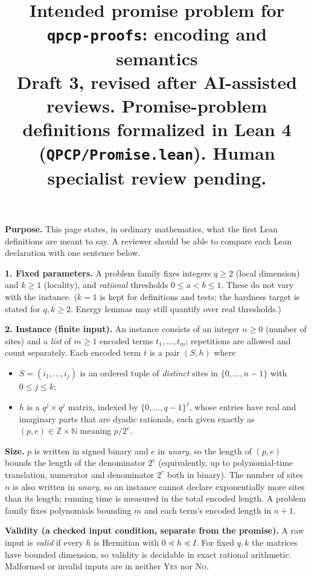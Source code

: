 \documentclass[10pt]{article}
\title{\vspace{-1.2cm}\large\bfseries Intended promise problem for \texttt{qpcp-proofs}: encoding and semantics\\[2pt]
\normalsize\mdseries Draft 3, revised after AI-assisted reviews. Promise-problem definitions formalized in Lean 4\\(\texttt{QPCP/Promise.lean}). Human specialist review pending.}
\date{\vspace{-1.4cm}}
\begin{document}
\maketitle

\textbf{Purpose.} This page states, in ordinary mathematics, what the first Lean definitions are meant to say.
A reviewer should be able to compare each Lean declaration with one sentence below.

\textbf{1. Fixed parameters.} A problem family fixes integers $q\ge 2$ (local dimension) and $k\ge 1$ (locality),
and \emph{rational} thresholds $0\le a<b\le 1$. These do not vary with the instance. ($k=1$ is kept for
definitions and tests; the hardness target is stated for $q,k\ge 2$. Energy lemmas may still quantify over real thresholds.)

\textbf{2. Instance (finite input).} An instance consists of an integer $n\ge 0$ (number of sites) and a
\emph{list} of $m\ge 1$ encoded terms $t_1,\dots,t_m$; repetitions are allowed and count separately.
Each encoded term $t$ is a pair $(S,h)$ where
\begin{itemize}\setlength{\itemsep}{0pt}
\item $S=(i_1,\dots,i_j)$ is an ordered tuple of \emph{distinct} sites in $\{0,\dots,n-1\}$ with $0\le j\le k$;
\item $h$ is a $q^{j}\times q^{j}$ matrix, indexed by $\{0,\dots,q-1\}^{j}$, whose entries have real and
imaginary parts that are dyadic rationals, each given exactly as $(p,e)\in\mathbb{Z}\times\mathbb{N}$ meaning $p/2^{e}$.
\end{itemize}
\textbf{Size.} $p$ is written in signed binary and $e$ in \emph{unary}, so the length of $(p,e)$ bounds the length of
the denominator $2^{e}$ (equivalently, up to polynomial-time translation, numerator and denominator $2^e$ both in binary). The number of sites $n$ is also written in \emph{unary}, so an instance cannot declare exponentially more sites than its length; running time is measured in the total encoded length. A problem family fixes polynomials bounding $m$ and each term's encoded length in $n+1$.

\textbf{Validity (a checked input condition, separate from the promise).} A raw input is \emph{valid} if every $h$ is
Hermitian with $0\preceq h\preceq I$. For fixed $q,k$ the matrices have bounded dimension, so validity is decidable
in exact rational arithmetic. Malformed or invalid inputs are in neither \textsc{Yes} nor \textsc{No}.
\end{document}
